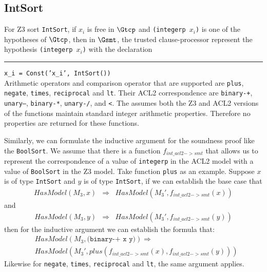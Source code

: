 \subsection{IntSort}\label{subsec:ints}
For Z3 sort \texttt{IntSort}, if $x_i$ is free in $\Gtcp$ and
\texttt{(integerp $x_i$)} is one of the hypotheses of $\Gtcp$,
then in $\Gsmt$, the trusted clause-processor represent the hypothesis
\texttt{(integerp $x_i$)} with the declaration\\
\rule{2em}{0ex}\texttt{x\_i = Const('x\_i', IntSort())}\\
Arithmetic operators and comparison operator that are supported are
\texttt{plus}, \texttt{negate}, \texttt{times}, \texttt{reciprocal} and
\texttt{lt}. Their ACL2 correspondence are \texttt{binary-+}, \texttt{unary--},
\texttt{binary-*}, \texttt{unary-/}, and \texttt{<}. The \smtlink{} assumes both
the Z3 and ACL2 versions of the functions maintain standard integer arithmetic
properties. Therefore no properties are returned for these functions.

Similarly, we can formulate the inductive argument for the soundness proof like
the \texttt{BoolSort}. We assume that there is a function $f_{int\_acl2->smt}$
that allows us to represent the correspondence of a value of \texttt{integerp}
in the ACL2 model with a value of \texttt{BoolSort} in the Z3 model. Take
function \texttt{plus} as an example. Suppose $x$ is of type \texttt{IntSort}
and $y$ is of type \texttt{IntSort}, if we can establish the base case that
\begin{equation}\label{eq:intsortplusbase}\begin{array}{rcl}
HasModel(M_3, x) &\Rightarrow& HasModel(M_3', f_{int\_acl2->smt}(x))
\end{array}\end{equation}
and
\begin{equation}\label{eq:intsortplusbase}\begin{array}{rcl}
HasModel(M_3, y) &\Rightarrow& HasModel(M_3', f_{int\_acl2->smt}(y))
\end{array}\end{equation}
then for the inductive argument we can establish the formula that:
\begin{equation}\label{eq:intsortplusinductive}\begin{array}{rcl}
&HasModel(M_3, \texttt{(binary-+ x y)}) \Rightarrow \\
&HasModel(M_3', plus(f_{int\_acl2->smt}(x), f_{int\_acl2->smt}(y)))
\end{array}\end{equation}
Likewise for \texttt{negate}, \texttt{times}, \texttt{reciprocal} and
\texttt{lt}, the same argument applies.

